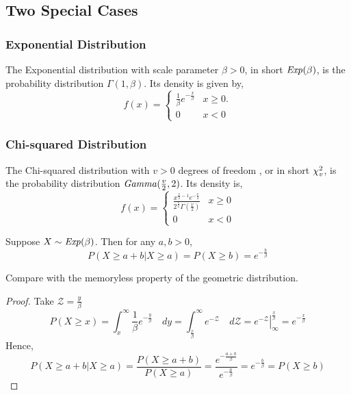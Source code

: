 \subsection{Two Special Cases}
\subsubsection*{Exponential Distribution}
\begin{definition}
The Exponential distribution with scale parameter $\beta > 0$, in short
$\text{\emph{Exp}}(\beta)$, is the probability distribution $\Gamma(1, \beta)$. Its
density is given by,
\[
    f(x) = \begin{cases}
        \frac{1}{\beta} e^{-\frac{x}{\beta}}   & x \geq 0.                \\
        0                                      & x < 0                    
    \end{cases}
\]
\end{definition}

\subsubsection*{Chi-squared Distribution}
\begin{definition}
The Chi-squared distribution with $v > 0$ degrees of freedom , or in short
$\chi_{v}^2$, is the probability distribution $\text{\emph{Gamma}}(\frac{v}{2}, 2)$.
Its density is,
\[
    f(x) = \begin{cases}
        \frac{x^{\frac{v}{2} - 1} e^{-\frac{x}{2}}}
             {2^{\frac{v}{2}} \Gamma(\frac{v}{2})}       & x \geq 0       \\
        0                                                & x < 0
    \end{cases}
\]
\end{definition}

\begin{theorem}
Suppose $X \sim \text{\emph{Exp}}(\beta)$. Then for any $a, b > 0$,
\[
      P(X \geq a + b \vert X \geq a)
    = P(X \geq b)
    = e^{-\frac{b}{\beta}}
\]
\end{theorem}
\note Compare with the memoryless property of the geometric distribution.
\begin{proof}
Take $\mathcal{Z} = \frac{y}{\beta}$
\[
    P(X \geq x) = \int_{x}^{\infty} 
                      \frac{1}{\beta} e^{-\frac{y}{\beta}}
                  \quad dy
                = \int_{\frac{x}{\beta}}^{\infty}
                      e^{-\mathcal{Z}}
                  \quad d\mathcal{Z}
                = \left. 
                      e^{-\mathcal{Z}}
                  \right\vert_{\infty}^{\frac{x}{\beta}}
                = e^{-\frac{x}{\beta}}
\]
Hence,
\[
      P(X \geq a + b \vert X \geq a)
    = \frac{P(X \geq a + b)}{P(X \geq a)}
    = \frac{e^{-\frac{a + b}{\beta}}}{e^{-\frac{a}{\beta}}}
    = e^{-\frac{b}{\beta}}
    = P(X \geq b)
\]
\end{proof}


